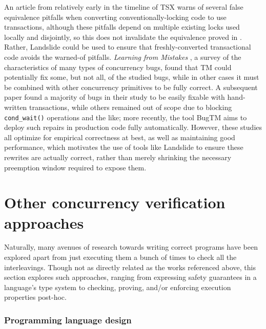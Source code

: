 An article from relatively early in the timeline of TSX \cite{htm-subtleties}
warns of several false equivalence pitfalls when converting conventionally-locking code to use transactions,
although these pitfalls depend on multiple existing locks used locally and disjointly,
so this does not invalidate the equivalence proved in \sect{\ref{sec:tm-design-locks}}.
Rather, Landslide could be used to ensure that freshly-converted transactional code avoids the warned-of pitfalls.
{\em Learning from Mistakes} \cite{learning-from-mistakes},
a survey of the characteristics of many types of concurrency bugs,
found that TM could potentially fix some, but not all, of the studied bugs,
while in other cases it must be combined with other concurrency primitives to be fully correct.
A subsequent paper \cite{applying-tm-bugs}
found a majority of bugs in their study to be easily fixable with hand-written transactions,
while others remained out of scope due to blocking {\tt cond\_wait()} operations and the like;
more recently, the tool BugTM \cite{bugtm} aims to deploy such repairs in production code fully automatically.
However, these studies all optimize for empirical correctness at best,
as well as maintaining good performance,
which motivates the use of tools like Landslide to ensure these rewrites
are actually correct,
rather than merely shrinking the necessary preemption window required to expose them.


\section{Other concurrency verification approaches}

Naturally, many avenues of research towards writing correct programs
have been explored
apart from just executing them a bunch of times to check all the interleavings.
Though not as directly related as the works referenced above,
this section explores such approaches,
ranging from expressing safety guarantees in a language's type system
to checking, proving, and/or enforcing execution properties post-hoc.

\subsubsection{Programming language design}

